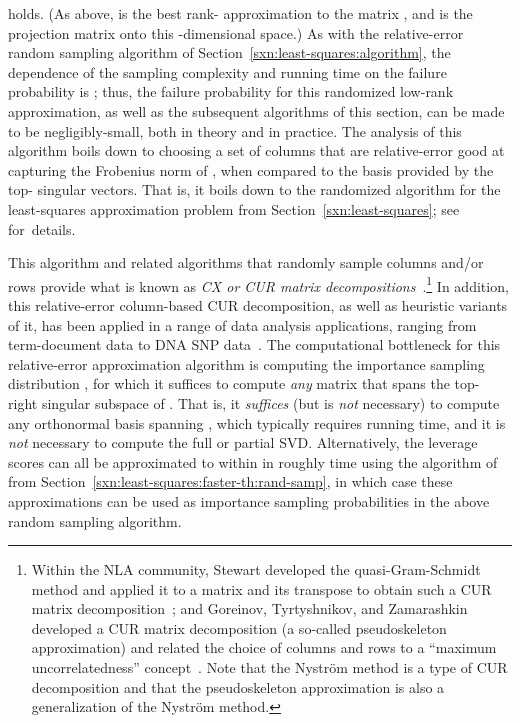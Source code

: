 \documentclass[twoside]{article}
\begin{document}
holds.   (As above,  is the best rank- approximation to the matrix , and 
 is the projection matrix onto this -dimensional space.)
As with the relative-error random sampling algorithm of 
Section~\ref{sxn:least-squares:algorithm}, the dependence of the sampling 
complexity and running time on the failure probability  is 
;
thus, the failure probability for this randomized low-rank approximation, 
as well as the subsequent algorithms of this section, can be made to be 
negligibly-small, both in theory and in practice.
The analysis of this algorithm boils down to choosing a set of columns 
that are relative-error good at capturing the Frobenius norm of , when
compared to the basis provided by the top- singular vectors.
That is, it boils down to the randomized algorithm for the least-squares 
approximation problem from Section~\ref{sxn:least-squares}; 
see~\cite{DMM08_CURtheory_JRNL,CUR_PNAS} for~details.

This algorithm and related algorithms that randomly sample columns and/or 
rows provide what is known as \emph{CX or CUR matrix 
decompositions}~\cite{dkm_matrix3,DMM08_CURtheory_JRNL,CUR_PNAS}.\footnote{Within the NLA community, Stewart developed the quasi-Gram-Schmidt 
method and applied it to a matrix and its transpose to obtain such a CUR 
matrix decomposition~\cite{Ste99,BPS04_TR}; and Goreinov, Tyrtyshnikov, and 
Zamarashkin developed a CUR matrix decomposition (a so-called pseudoskeleton 
approximation) and related the choice of columns and rows to a ``maximum 
uncorrelatedness'' concept~\cite{GTZ97,GT01}.  Note that the Nystr\"{o}m 
method is a type of CUR decomposition and that the pseudoskeleton
approximation is also a generalization of the Nystr\"{o}m method.}
In addition, this relative-error column-based CUR decomposition, as well as 
heuristic variants of it, has been applied in a range of data analysis 
applications, ranging from term-document data to DNA SNP 
data~\cite{CUR_PNAS,Paschou07a,Paschou07b}.
The computational bottleneck for this relative-error approximation algorithm 
is computing the importance sampling distribution , for 
which it suffices to compute \emph{any}  matrix  that 
spans the top- right singular subspace of .
That is, it \emph{suffices} (but is \emph{not} necessary) to compute any 
orthonormal basis spanning , which typically requires  
running time, and it is \emph{not} necessary to compute the full or partial 
SVD.
Alternatively, the leverage scores can all be 
approximated to within  in roughly  time using 
the algorithm of~\cite{DMMW11_TR} from 
Section~\ref{sxn:least-squares:faster-th:rand-samp}, in which case these 
approximations can be used as importance sampling probabilities in the 
above random sampling algorithm.
\end{document}
